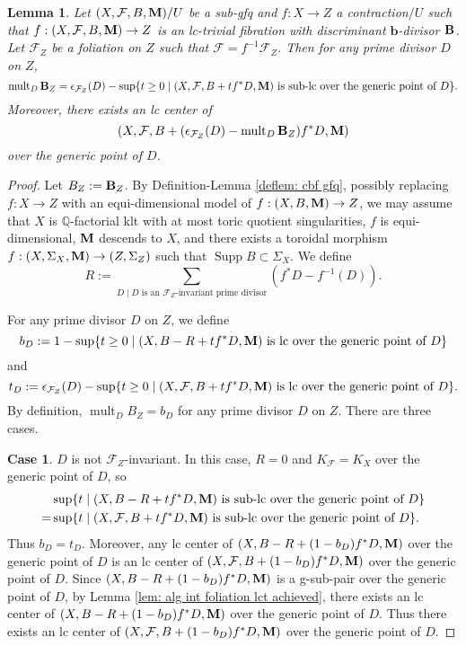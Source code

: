 \documentclass[11pt]{amsart}
\numberwithin{equation}{section}
\newcommand{\bb}{\bm{b}}
\newcommand{\Mm}{{\bf{M}}}
\newcommand{\Qq}{\mathbb{Q}}
\newcommand{\Supp}{\operatorname{Supp}}
\newcommand{\mult}{\operatorname{mult}}
\newcommand{\Bb}{{\bf{B}}}
\newcommand{\Ff}{\mathcal{F}}
\newtheorem{lem}[thm]{Lemma}
\theoremstyle{definition}
\theoremstyle{definition}
\theoremstyle{definition}
\begin{document}
\begin{lem}\label{lem: td=bd}
 Let $(X,\Ff,B,\Mm)/U$ be a sub-gfq and $f: X\rightarrow Z$ a contraction$/U$ such that $f: (X,\Ff,B,\Mm)\rightarrow Z$ is an lc-trivial fibration with discriminant $\bb$-divisor $\Bb$. Let $\Ff_Z$ be a foliation on $Z$ such that $\Ff=f^{-1}\Ff_Z$. Then for any prime divisor $D$ on $Z$, 
$$\mult_D\Bb_Z=\epsilon_{\Ff_Z}(D)-\sup\{t\geq 0\mid (X,\Ff,B+tf^*D,\Mm)\text{ is sub-lc over the generic point of } D\}.$$
Moreover, there exists an lc center of $$(X,\Ff,B+(\epsilon_{\Ff_Z}(D)-\mult_D\Bb_Z)f^*D,\Mm)$$ over the generic point of $D$.
\end{lem}
\begin{proof}
Let $B_Z:=\Bb_Z$. By Definition-Lemma \ref{deflem: cbf gfq}, possibly replacing $f: X\rightarrow Z$ with an equi-dimensional model of $f: (X,B,\Mm)\rightarrow Z$, we may assume that $X$ is $\Qq$-factorial klt with at most toric quotient singularities, $f$ is equi-dimensional, $\Mm$ descends to $X$, and there exists a toroidal morphism $f: (X,\Sigma_X,\Mm)\rightarrow (Z,\Sigma_Z)$ such that $\Supp B\subset\Sigma_X$. We define
$$R:=\sum_{D\mid D\text{ is an }\Ff_Z\text{-invariant prime divisor}}(f^*D-f^{-1}(D)).$$ 

For any prime divisor $D$ on $Z$, we define 
$$b_D:=1-\sup\{t\geq 0\mid (X,B-R+tf^*D,\Mm)\text{ is lc over the generic point of } D\}$$
and
$$t_D:=\epsilon_{\Ff_Z}(D)-\sup\{t\geq 0\mid (X,\Ff,B+tf^*D,\Mm)\text{ is lc over the generic point of } D\}.$$
By definition, $\mult_DB_Z=b_D$ for any prime divisor $D$ on $Z$. There are three cases.

\medskip

\noindent\textbf{Case 1}. $D$ is not $\Ff_Z$-invariant. In this case, $R=0$ and $K_{\Ff}=K_X$ over the generic point of $D$, so
\begin{align*}
    &\sup\{t\mid (X,B-R+tf^*D,\Mm)\text{ is sub-lc over the generic point of } D\}\\
    =&\sup\{t\mid (X,\Ff,B+tf^*D,\Mm)\text{ is sub-lc over the generic point of } D\}.
\end{align*}
Thus $b_D=t_D$. Moreover, any lc center of $(X,B-R+(1-b_D)f^*D,\Mm)$ over the generic point of $D$ is an lc center of $(X,\Ff,B+(1-b_D)f^*D,\Mm)$ over the generic point of $D$. Since $(X,B-R+(1-b_D)f^*D,\Mm)$ is a g-sub-pair over the generic point of $D$, by Lemma \ref{lem: alg int foliation lct achieved}, there exists an lc center of  $(X,B-R+(1-b_D)f^*D,\Mm)$ over the generic point of $D$. Thus there exists an lc center of $(X,\Ff,B+(1-b_D)f^*D,\Mm)$ over the generic point of $D$.


\end{proof}
\end{document}
